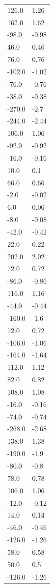 \begin{longtable}{ll}
126.0 & 1.26 \\
162.0 & 1.62 \\
-98.0 & -0.98 \\
46.0 & 0.46 \\
76.0 & 0.76 \\
-102.0 & -1.02 \\
-76.0 & -0.76 \\
-38.0 & -0.38 \\
-270.0 & -2.7 \\
-244.0 & -2.44 \\
106.0 & 1.06 \\
-92.0 & -0.92 \\
-16.0 & -0.16 \\
10.0 & 0.1 \\
66.0 & 0.66 \\
-2.0 & -0.02 \\
6.0 & 0.06 \\
-8.0 & -0.08 \\
-42.0 & -0.42 \\
22.0 & 0.22 \\
202.0 & 2.02 \\
72.0 & 0.72 \\
-86.0 & -0.86 \\
116.0 & 1.16 \\
-44.0 & -0.44 \\
-160.0 & -1.6 \\
72.0 & 0.72 \\
-106.0 & -1.06 \\
-164.0 & -1.64 \\
112.0 & 1.12 \\
82.0 & 0.82 \\
108.0 & 1.08 \\
-16.0 & -0.16 \\
-74.0 & -0.74 \\
-268.0 & -2.68 \\
138.0 & 1.38 \\
-190.0 & -1.9 \\
-80.0 & -0.8 \\
78.0 & 0.78 \\
106.0 & 1.06 \\
-12.0 & -0.12 \\
14.0 & 0.14 \\
-46.0 & -0.46 \\
-126.0 & -1.26 \\
58.0 & 0.58 \\
50.0 & 0.5 \\
-126.0 & -1.26 \\

\end{longtable}
